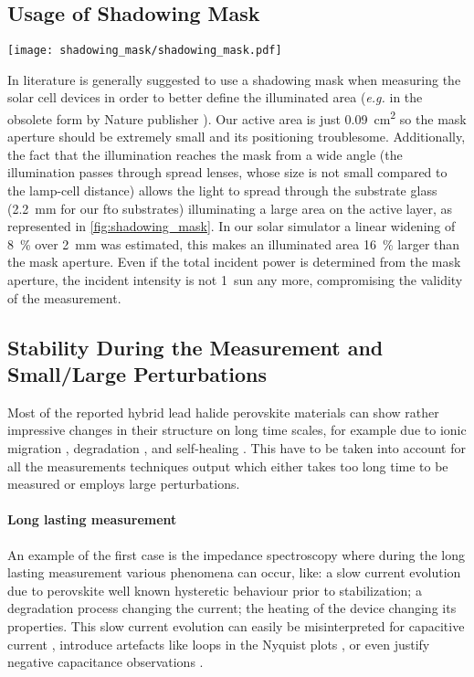 	\subsection{Usage of Shadowing Mask}

		\begin{SCfigure}
			\centering
			\texttt{[image: shadowing\_mask/shadowing\_mask.pdf]}
			\label{fig:shadowing_mask}
		\end{SCfigure}

		In literature is generally suggested to use a shadowing mask when measuring the solar cell devices in order to better define the illuminated area (\textsl{e.g.} in the obsolete \cite{Brinser2017} form by Nature publisher \cite{NatureResearch2017}).
		Our active area is just \SI{0.09}{\square\cm} so the mask aperture should be extremely small and its positioning troublesome.
		Additionally, the fact that the illumination reaches the mask from a wide angle (the illumination passes through spread lenses, whose size is not small compared to the lamp-cell distance) allows the light to spread through the substrate glass (\SI{2.2}{\mm} for our \gls{fto} substrates) illuminating a large area on the active layer, as represented in \cref{fig:shadowing_mask}.
		In our solar simulator a linear widening of 8~\% over \SI{2}{\mm} was estimated, this makes an illuminated area 16~\% larger than the mask aperture.
		Even if the total incident power is determined from the mask aperture, the incident intensity is not 1~sun any more, compromising the validity of the measurement.


	\subsection{Stability During the Measurement and Small/Large Perturbations}

		Most of the reported hybrid lead halide perovskite materials can show rather impressive changes in their structure on long time scales, for example due to ionic migration \cite{Calado2016}, degradation \cite{OKane2019}, and self-healing \cite{Ceratti2018}.
		This have to be taken into account for all the measurements techniques output which either takes too long time to be measured or employs large perturbations.

		\paragraph{Long lasting measurement}
		An example of the first case is the impedance spectroscopy where during the long lasting measurement various phenomena can occur, like: a slow current evolution due to perovskite well known hysteretic behaviour prior to stabilization; a degradation process changing the current; the heating of the device changing its properties.
		This slow current evolution can easily be misinterpreted for capacitive current \cite{Jacobs2018}, introduce artefacts like loops in the Nyquist plots \cite{Moia2019}, or even justify negative capacitance observations \cite{Knapp2015}.

